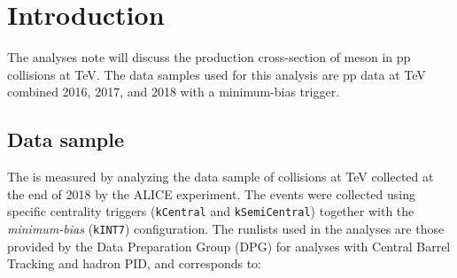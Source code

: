 \section{Introduction}

The analyses note will discuss the production cross-section of \Dstar meson in pp collisions at  TeV. The data samples used for this analysis are pp data at  TeV combined 2016, 2017, and 2018 with a minimum-bias trigger. 

 
 
\subsection{Data sample}
\label{sec:data_sample}
The \raa is measured by analyzing the data sample of \pbpb collisions at  TeV collected at the end of 2018 by the ALICE experiment. The events were collected using specific centrality triggers (\texttt{kCentral} and \texttt{kSemiCentral}) together with the \textit{minimum-bias} (\texttt{kINT7}) configuration.
The runlists used in the analyses are those provided by the Data Preparation Group (DPG) for analyses with Central Barrel Tracking and hadron PID, and corresponds to:


